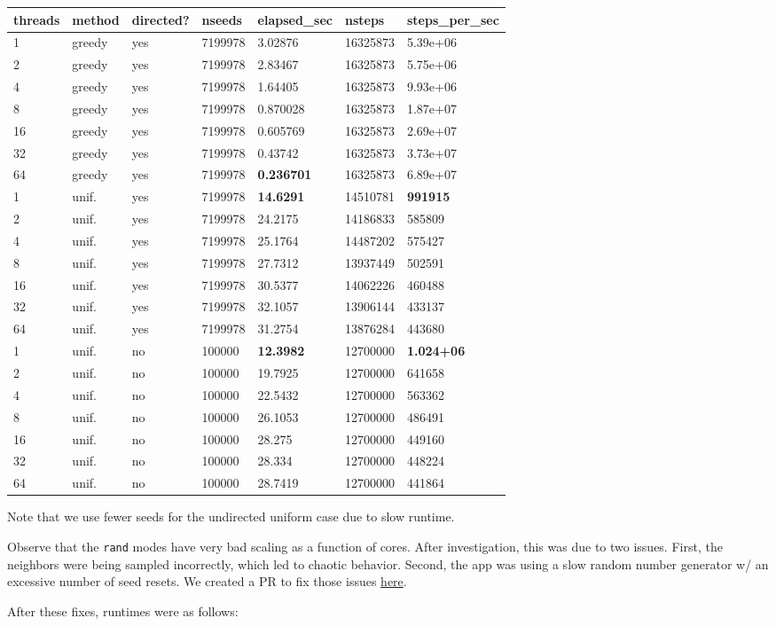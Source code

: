 \documentclass[10pt,oneside]{memoir}
\begin{document}
\begin{longtable}[]{@{}lllllll@{}}
\toprule
threads & method & directed? & nseeds & elapsed\_sec & nsteps &
steps\_per\_sec\tabularnewline
\midrule
\endhead
1 & greedy & yes & 7199978 & 3.02876 & 16325873 &
5.39e+06\tabularnewline
2 & greedy & yes & 7199978 & 2.83467 & 16325873 &
5.75e+06\tabularnewline
4 & greedy & yes & 7199978 & 1.64405 & 16325873 &
9.93e+06\tabularnewline
8 & greedy & yes & 7199978 & 0.870028 & 16325873 &
1.87e+07\tabularnewline
16 & greedy & yes & 7199978 & 0.605769 & 16325873 &
2.69e+07\tabularnewline
32 & greedy & yes & 7199978 & 0.43742 & 16325873 &
3.73e+07\tabularnewline
64 & greedy & yes & 7199978 & \textbf{0.236701} & 16325873 &
6.89e+07\tabularnewline
1 & unif. & yes & 7199978 & \textbf{14.6291} & 14510781 &
\textbf{991915}\tabularnewline
2 & unif. & yes & 7199978 & 24.2175 & 14186833 & 585809\tabularnewline
4 & unif. & yes & 7199978 & 25.1764 & 14487202 & 575427\tabularnewline
8 & unif. & yes & 7199978 & 27.7312 & 13937449 & 502591\tabularnewline
16 & unif. & yes & 7199978 & 30.5377 & 14062226 & 460488\tabularnewline
32 & unif. & yes & 7199978 & 32.1057 & 13906144 & 433137\tabularnewline
64 & unif. & yes & 7199978 & 31.2754 & 13876284 & 443680\tabularnewline
1 & unif. & no & 100000 & \textbf{12.3982} & 12700000 &
\textbf{1.024+06}\tabularnewline
2 & unif. & no & 100000 & 19.7925 & 12700000 & 641658\tabularnewline
4 & unif. & no & 100000 & 22.5432 & 12700000 & 563362\tabularnewline
8 & unif. & no & 100000 & 26.1053 & 12700000 & 486491\tabularnewline
16 & unif. & no & 100000 & 28.275 & 12700000 & 449160\tabularnewline
32 & unif. & no & 100000 & 28.334 & 12700000 & 448224\tabularnewline
64 & unif. & no & 100000 & 28.7419 & 12700000 & 441864\tabularnewline
\bottomrule
\end{longtable}

Note that we use fewer seeds for the undirected uniform case due to slow
runtime.

Observe that the \texttt{rand} modes have very bad scaling as a function
of cores. After investigation, this was due to two issues. First, the
neighbors were being sampled incorrectly, which led to chaotic behavior.
Second, the app was using a slow random number generator w/ an excessive
number of seed resets. We created a PR to fix those issues
\href{https://gitlab.hiveprogram.com/pnnl/graphsearch/merge_requests/1}{here}.

After these fixes, runtimes were as follows:
\end{document}
